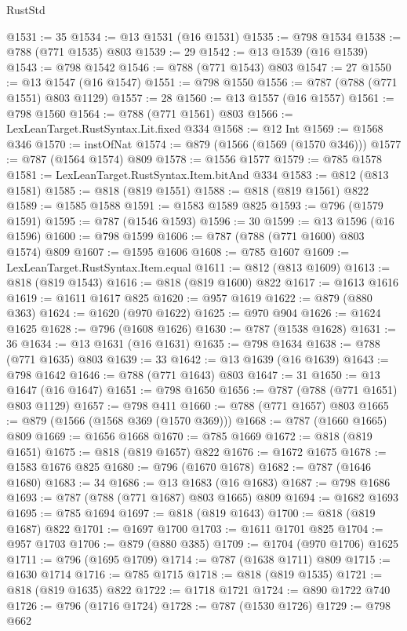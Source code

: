 \begin{lexlean}{RustStd}
\begin{coremodule}
@1531 := 35
@1534 := @13 @1531 (@16 @1531)
@1535 := @798 @1534
@1538 := @788 (@771 @1535) @803
@1539 := 29
@1542 := @13 @1539 (@16 @1539)
@1543 := @798 @1542
@1546 := @788 (@771 @1543) @803
@1547 := 27
@1550 := @13 @1547 (@16 @1547)
@1551 := @798 @1550
@1556 := @787 (@788 (@771 @1551) @803 @1129)
@1557 := 28
@1560 := @13 @1557 (@16 @1557)
@1561 := @798 @1560
@1564 := @788 (@771 @1561) @803
@1566 := LexLeanTarget.RustSyntax.Lit.fixed @334
@1568 := @12 Int
@1569 := @1568 @346
@1570 := instOfNat
@1574 := @879 (@1566 (@1569 (@1570 @346)))
@1577 := @787 (@1564 @1574) @809
@1578 := @1556 @1577
@1579 := @785 @1578
@1581 := LexLeanTarget.RustSyntax.Item.bitAnd @334
@1583 := @812 (@813 @1581)
@1585 := @818 (@819 @1551)
@1588 := @818 (@819 @1561) @822
@1589 := @1585 @1588
@1591 := @1583 @1589 @825
@1593 := @796 (@1579 @1591)
@1595 := @787 (@1546 @1593)
@1596 := 30
@1599 := @13 @1596 (@16 @1596)
@1600 := @798 @1599
@1606 := @787 (@788 (@771 @1600) @803 @1574) @809
@1607 := @1595 @1606
@1608 := @785 @1607
@1609 := LexLeanTarget.RustSyntax.Item.equal
@1611 := @812 (@813 @1609)
@1613 := @818 (@819 @1543)
@1616 := @818 (@819 @1600) @822
@1617 := @1613 @1616
@1619 := @1611 @1617 @825
@1620 := @957 @1619
@1622 := @879 (@880 @363)
@1624 := @1620 (@970 @1622)
@1625 := @970 @904
@1626 := @1624 @1625
@1628 := @796 (@1608 @1626)
@1630 := @787 (@1538 @1628)
@1631 := 36
@1634 := @13 @1631 (@16 @1631)
@1635 := @798 @1634
@1638 := @788 (@771 @1635) @803
@1639 := 33
@1642 := @13 @1639 (@16 @1639)
@1643 := @798 @1642
@1646 := @788 (@771 @1643) @803
@1647 := 31
@1650 := @13 @1647 (@16 @1647)
@1651 := @798 @1650
@1656 := @787 (@788 (@771 @1651) @803 @1129)
@1657 := @798 @411
@1660 := @788 (@771 @1657) @803
@1665 := @879 (@1566 (@1568 @369 (@1570 @369)))
@1668 := @787 (@1660 @1665) @809
@1669 := @1656 @1668
@1670 := @785 @1669
@1672 := @818 (@819 @1651)
@1675 := @818 (@819 @1657) @822
@1676 := @1672 @1675
@1678 := @1583 @1676 @825
@1680 := @796 (@1670 @1678)
@1682 := @787 (@1646 @1680)
@1683 := 34
@1686 := @13 @1683 (@16 @1683)
@1687 := @798 @1686
@1693 := @787 (@788 (@771 @1687) @803 @1665) @809
@1694 := @1682 @1693
@1695 := @785 @1694
@1697 := @818 (@819 @1643)
@1700 := @818 (@819 @1687) @822
@1701 := @1697 @1700
@1703 := @1611 @1701 @825
@1704 := @957 @1703
@1706 := @879 (@880 @385)
@1709 := @1704 (@970 @1706) @1625
@1711 := @796 (@1695 @1709)
@1714 := @787 (@1638 @1711) @809
@1715 := @1630 @1714
@1716 := @785 @1715
@1718 := @818 (@819 @1535)
@1721 := @818 (@819 @1635) @822
@1722 := @1718 @1721
@1724 := @890 @1722 @740
@1726 := @796 (@1716 @1724)
@1728 := @787 (@1530 @1726)
@1729 := @798 @662

\end{coremodule}
\end{lexlean}
